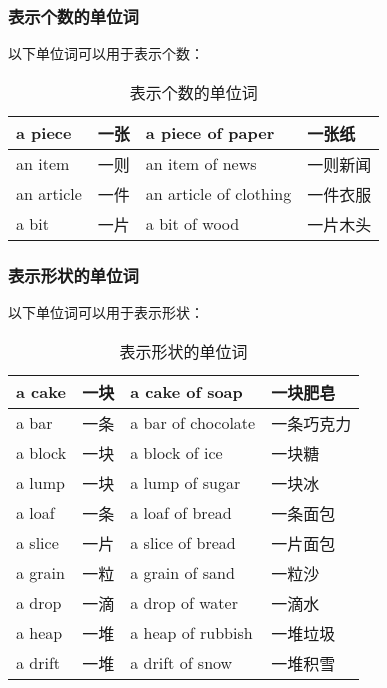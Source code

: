 \documentclass[UTF8]{ctexart}
\begin{document}
\subsubsection{表示个数的单位词}    
    以下单位词可以用于表示个数：
    \begin{table}[h]
        \begin{center}
            \ttfamily
            \begin{tabular}{p{70pt}|p{50pt}|p{150pt}|p{60pt}}
                \hline
                a piece&一张&a piece of paper&一张纸\\ \hline
                an item&一则&an item of news&一则新闻\\ \hline
                an article&一件&an article of clothing&一件衣服\\ \hline
                a bit&一片&a bit of wood&一片木头\\ \hline
            \end{tabular}
            \rmfamily
            \caption{表示个数的单位词}
        \end{center}
    \end{table}\vspace{-25pt}

\subsubsection{表示形状的单位词}
    以下单位词可以用于表示形状：
    \begin{table}[h]
        \begin{center}
            \ttfamily
            \begin{tabular}{p{60pt}|p{50pt}|p{150pt}|p{60pt}}
                \hline
                a cake&一块&a cake of soap&一块肥皂\\ \hline
                a bar&一条&a bar of chocolate&一条巧克力\\ \hline
                a block&一块&a block of ice&一块糖\\ \hline
                a lump&一块&a lump of sugar&一块冰\\ \hline
                a loaf&一条&a loaf of bread&一条面包\\ \hline
                a slice&一片&a slice of bread&一片面包\\ \hline
                a grain&一粒&a grain of sand&一粒沙\\ \hline
                a drop&一滴&a drop of water&一滴水\\ \hline
                a heap&一堆&a heap of rubbish&一堆垃圾\\ \hline
                a drift&一堆&a drift of snow&一堆积雪\\ \hline
            \end{tabular}
            \rmfamily
            \caption{表示形状的单位词}
        \end{center}
    \end{table}
\end{document}
